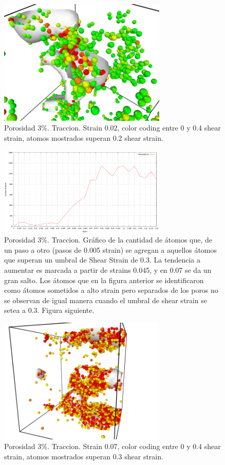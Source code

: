 \documentclass[10pt, oneside]{article} %
\begin{document}
\begin{figure}[H]
\centering
\includegraphics[width=8cm]{Figures/porosidad_3_strain002_color_0_04.png}
\caption{Porosidad 3\%. Traccion. Strain 0.02, color coding entre 0 y 0.4 shear strain, atomos mostrados superan 0.2 shear strain. }
\end{figure}

\begin{figure}[H]
\centering
\includegraphics[width=8cm]{Figures/porosidad_trac_umbral3.png}
\caption{Porosidad 3\%. Traccion. Gráfico de la cantidad de átomos que, de un paso a otro (pasos de 0.005 strain) se agregan a aquellos átomos que superan un umbral de Shear Strain de 0.3. La tendencia a aumentar es marcada a partir de strains 0.045, y en 0.07 se da un gran salto. Los átomos que en la figura anterior se identificaron como átomos sometidos a alto strain pero separados de los poros no se observan de igual manera cuando el umbral de shear strain se setea a 0.3. Figura siguiente.}
\end{figure}

\begin{figure}[H]
\centering
\includegraphics[width=8cm]{Figures/porosidad_3_strain007_color_0_04.png}
\caption{Porosidad 3\%. Traccion. Strain 0.07, color coding entre 0 y 0.4 shear strain, atomos mostrados superan 0.3 shear strain.}
\end{figure}
\end{document}
